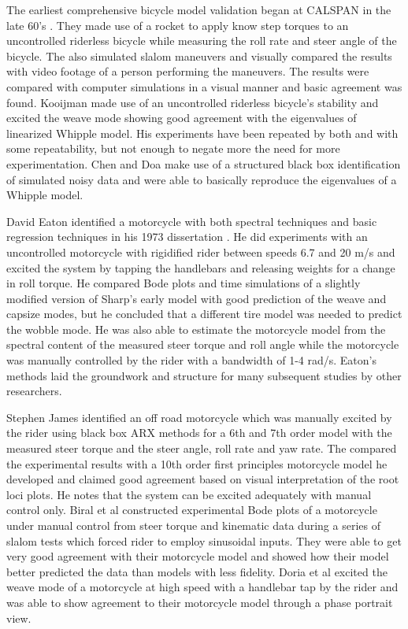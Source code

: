 \documentclass[twocolumn,10pt]{asme2e}
\begin{document}
The earliest comprehensive bicycle model validation began at CALSPAN in the
late 60's \cite{Roland1971}. They made use of a rocket to apply know step
torques to an uncontrolled riderless bicycle while measuring the roll rate and
steer angle of the bicycle. The also simulated slalom maneuvers and visually
compared the results with video footage of a person performing the maneuvers.
The results were compared with computer simulations in a visual manner and
basic agreement was found. Kooijman \cite{Kooijman2006, Kooijman2009}
made use of an uncontrolled riderless bicycle's stability and excited the weave
mode showing good agreement with the eigenvalues of linearized Whipple model.
His experiments have been repeated by both \cite{Stevens2009} and
\cite{Escolona2011} with some repeatability, but not enough to negate more the
need for more experimentation. Chen and Doa \cite{Chen2010} make use of a
structured black box identification of simulated noisy data and were able to
basically reproduce the eigenvalues of a Whipple model. 

David Eaton identified a motorcycle with both spectral techniques and basic
regression techniques in his 1973 dissertation \cite{Eaton1973}. He did
experiments with an uncontrolled motorcycle with rigidified rider between speeds
6.7 and 20 m/s and excited the system by tapping the handlebars and releasing
weights for a change in roll torque. He compared Bode plots and time
simulations of a slightly modified version of Sharp's early model
\cite{Sharp1971} with good prediction of the weave and capsize modes, but he
concluded that a different tire model was needed to predict the wobble mode. He
was also able to estimate the motorcycle model from the spectral content of the
measured steer torque and roll angle while the motorcycle was manually
controlled by the rider with a bandwidth of 1-4 rad/s.  Eaton's methods laid
the groundwork and structure for many subsequent studies by other researchers.

Stephen James \cite{James2002} identified an off road motorcycle which was
manually excited by the rider using black box ARX methods for a 6th and 7th
order model with the measured steer torque and the steer angle, roll rate and
yaw rate. The compared the experimental results with a 10th order first
principles motorcycle model he developed and claimed good agreement based on
visual interpretation of the root loci plots. He notes that the system can be
excited adequately with manual control only. Biral et al \cite{Biral2003}
constructed experimental Bode plots of a motorcycle under manual control from
steer torque and kinematic data during a series of slalom tests which forced
rider to employ sinusoidal inputs. They were able to get very good agreement
with their motorcycle model and showed how their model better predicted the
data than models with less fidelity. Doria et al
\cite{Doria2012} excited the weave mode of a motorcycle at high speed with a
handlebar tap by the rider and was able to show agreement to their motorcycle
model through a phase portrait view.
\end{document}
